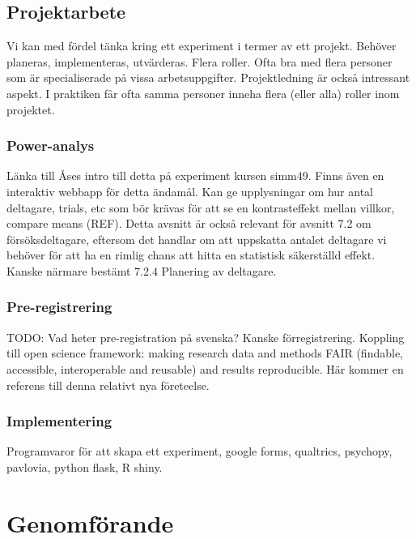 \documentclass[
]{book}
\begin{document}
\hypertarget{sec06.4}{%
\section{Projektarbete}\label{sec06.4}}

Vi kan med fördel tänka kring ett experiment i termer av ett projekt. Behöver planeras, implementeras, utvärderas. Flera roller. Ofta bra med flera personer som är specialiserade på vissa arbetsuppgifter. Projektledning är också intressant aspekt. I praktiken får ofta samma personer inneha flera (eller alla) roller inom projektet.

\hypertarget{sub06.4.1}{%
\subsection{Power-analys}\label{sub06.4.1}}

Länka till Åses intro till detta på experiment kursen simm49. Finns även en interaktiv webbapp för detta ändamål. Kan ge upplysningar om hur antal deltagare, trials, etc som bör krävas för att se en kontrasteffekt mellan villkor, compare means (REF). Detta avsnitt är också relevant för avsnitt 7.2 om försöksdeltagare, eftersom det handlar om att uppskatta antalet deltagare vi behöver för att ha en rimlig chans att hitta en statistisk säkerställd effekt. Kanske närmare bestämt 7.2.4 Planering av deltagare.

\hypertarget{sub06.4.2}{%
\subsection{Pre-registrering}\label{sub06.4.2}}

TODO: Vad heter pre-registration på svenska? Kanske förregistrering. Koppling till open science framework: making research data and methods FAIR (findable, accessible, interoperable and reusable) and results reproducible. Här kommer en referens \citep{van2016pre} till denna relativt nya företeelse.

\hypertarget{sub06.4.3}{%
\subsection{Implementering}\label{sub06.4.3}}

Programvaror för att skapa ett experiment, google forms, qualtrics, psychopy, pavlovia, python flask, R shiny.

\hypertarget{chap07}{%
\chapter{Genomförande}\label{chap07}}
\end{document}

